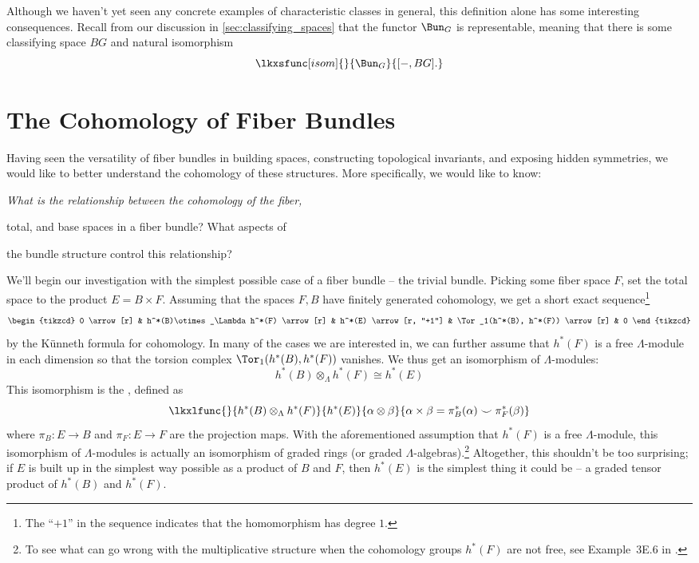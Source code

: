 Although we haven't yet seen any concrete examples of characteristic classes in general, this definition alone has some interesting consequences. Recall from our discussion in \cref{sec:classifying_spaces} that the functor $\Bun_G$ is representable, meaning that there is some classifying space $BG$ and natural isomorphism
\[
	\lkxsfunc[isom]{}{\Bun_G}{[-, BG].}
\]

\section{The Cohomology of Fiber Bundles}


Having seen the versatility of fiber bundles in building spaces, constructing topological invariants, and exposing hidden symmetries, we would like to better understand the cohomology of these structures. More specifically, we would like to know:

\begin{center}
	\slshape
	What is the relationship between the cohomology of the fiber,

	total, and base spaces in a fiber bundle? What aspects of

	the bundle structure control this relationship?
\end{center}

We'll begin our investigation with the simplest possible case of a fiber bundle -- the trivial bundle. Picking some fiber space $F$, set the total space to the product $E=B\times F$. Assuming that the spaces $F, B$ have finitely generated cohomology, we get a short exact sequence\footnote{The ``$+1$'' in the sequence indicates that the homomorphism has degree $1$.}
\[
	\begin{tikzcd}
		0 \arrow[r] & h^*(B)\otimes_\Lambda h^*(F) \arrow[r] & h^*(E) \arrow[r, "+1"] & \Tor_1(h^*(B), h^*(F)) \arrow[r] & 0
	\end{tikzcd}
\]
by the K\"unneth formula for cohomology. In many of the cases we are interested in, we can further assume that $h^*(F)$ is a free $\Lambda$-module in each dimension so that the torsion complex $\Tor_1(h^*(B), h^*(F))$ vanishes. We thus get an isomorphism of $\Lambda$-modules:
\[h^*(B)\otimes_\Lambda h^*(F)\cong h^*(E)\]
This isomorphism is the , defined as
\[
	\lkxlfunc{}{h^*(B)\otimes_\Lambda h^*(F)}{h^*(E)}{\alpha\otimes \beta}{\alpha\times\beta = \pi_B^*(\alpha)\smile \pi_F^*(\beta)}
\]
where $\pi_B : E \to B$ and $\pi_F : E \to F$ are the projection maps. With the aforementioned assumption that $h^*(F)$ is a free $\Lambda$-module, this isomorphism of $\Lambda$-modules is actually an isomorphism of graded rings (or graded $\Lambda$-algebras).\footnote{To see what can go wrong with the multiplicative structure when the cohomology groups $h^*(F)$ are not free, see Example~3E.6 in \cite{hatcher2002}.
}
Altogether, this shouldn't be too surprising; if $E$ is built up in the simplest way possible as a product of $B$ and $F$, then $h^*(E)$ is the simplest thing it could be -- a graded tensor product of $h^*(B)$ and $h^*(F)$.

